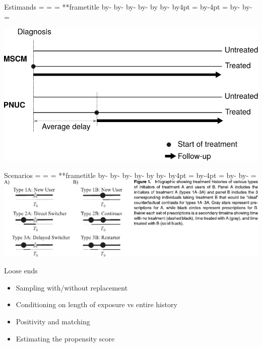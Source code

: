 \documentclass[aspectratio=169,12pt]{beamer} %
\makeatletter
\newif\ifsidebartheme
\newcommand*{\calculatespace}{%
    \contentheight=\paperheight%
    \ifx\beamer@frametitle\@empty%
        \setbox\@tempboxa=\box\voidb@x%
      \else%
        \setbox\@tempboxa=\vbox{%
          \vbox{}%
          {\parskip0pt\usebeamertemplate***{frametitle}}%
        }%
        \ifsidebartheme%
          \advance\contentheight by-1em%
        \fi%
      \fi%
    \advance\contentheight by-\ht\@tempboxa%
    \advance\contentheight by-\dp\@tempboxa%
    \advance\contentheight by-\beamer@frametopskip%
    \ifbeamer@plainframe%
    \contentbottom=0pt%
    \else%
    \advance\contentheight by-\headheight%
    \advance\contentheight by\headdp%
    \advance\contentheight by-\footheight%
    \advance\contentheight by4pt%
    \contentbottom=\footheight%
    \advance\contentbottom by-4pt%
    \fi%
    \contentwidth=\paperwidth%
    \ifbeamer@plainframe%
    \contentleft=0pt%
    \else%
    \advance\contentwidth by-\beamer@rightsidebar%
    \advance\contentwidth by-\beamer@leftsidebar\relax%
    \contentleft=\beamer@leftsidebar%
    \fi%
}
\makeatother
\begin{document}
\begin{frame}{Estimands}
    \calculatespace%
    \begin{center}
	\includegraphics[height=0.95\contentheight]{ref/estimands.pdf}
    \end{center}
\end{frame}

\begin{frame}{Scenarios}
    \calculatespace%
	\includegraphics[width=0.85\contentwidth]{ref/webster-fig1.pdf}
\end{frame}

\begin{frame}{Loose ends}
    \begin{itemize}
	\item Sampling with/without replacement
	\item Conditioning on length of exposure vs entire history
	\item Positivity and matching
	\item Estimating the propensity score
    \end{itemize}
\end{frame}

\end{document}
